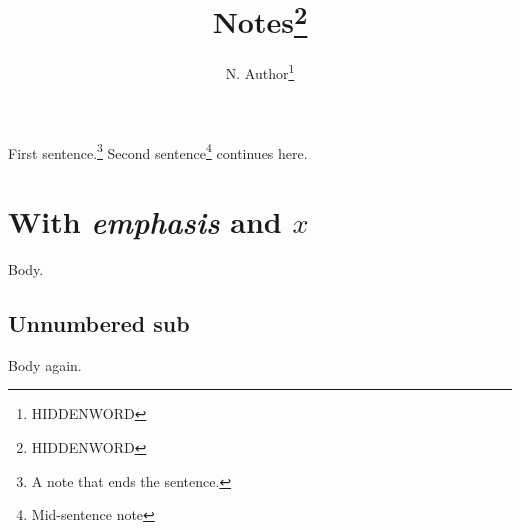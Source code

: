 \documentclass{article}
\title{Notes\thanks{HIDDENWORD}}
\author{N. Author\thanks{HIDDENWORD}}
\begin{document}
\maketitle
First sentence.\footnote{A note that ends the sentence.} Second sentence\footnote{Mid-sentence note} continues here.
\section{With \emph{emphasis} and $x$}
Body.
\subsection*{Unnumbered sub}
Body again.
\end{document}
